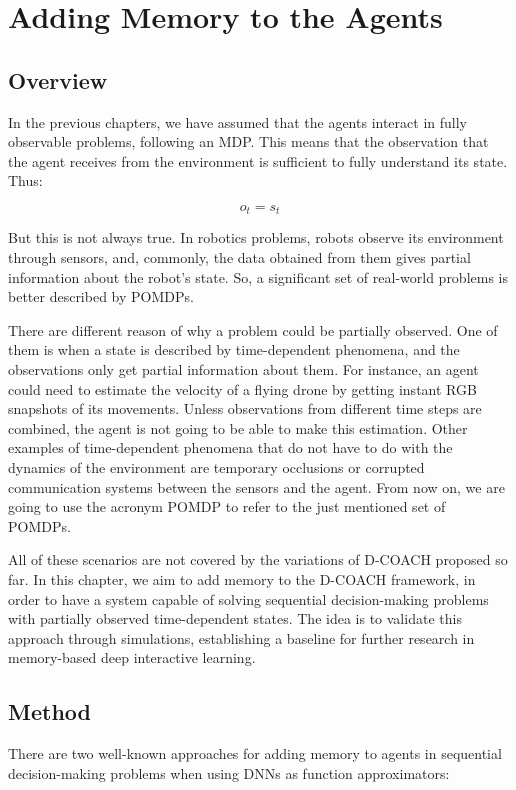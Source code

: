 \chapter{Adding Memory to the Agents}
\section{Overview}
In the previous chapters, we have assumed that the agents interact in fully observable problems, following an MDP. This means that the observation that the agent receives from the environment is sufficient to fully understand its state. Thus:

\begin{equation}
    o_{t} = s_{t}
\end{equation}

But this is not always true. In robotics problems, robots observe its environment through sensors, and, commonly, the data obtained from them gives partial information about the robot's state. So, a significant set of real-world problems is better described by POMDPs.

There are different reason of why a problem could be partially observed. One of them is when a state is described by time-dependent phenomena, and the observations only get partial information about them. For instance, an agent could need to estimate the velocity of a flying drone by getting instant RGB snapshots of its movements. Unless observations from different time steps are combined, the agent is not going to be able to make this estimation. Other examples of time-dependent phenomena that do not have to do with the dynamics of the environment are temporary occlusions or corrupted communication systems between the sensors and the agent. From now on, we are going to use the acronym POMDP to refer to the just mentioned set of POMDPs.

All of these scenarios are not covered by the variations of D-COACH proposed so far. In this chapter, we aim to add memory to the D-COACH framework, in order to have a system capable of solving sequential decision-making problems with partially observed time-dependent states. The idea is to validate this approach through simulations, establishing a baseline for further research in memory-based deep interactive learning.

\section{Method}
There are two well-known approaches for adding memory to agents in sequential decision-making problems when using DNNs as function approximators:

